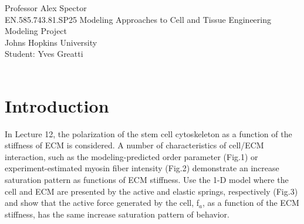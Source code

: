 \documentclass[12pt,twoside]{article}
\begin{document}
\noindent Professor Alex Spector\\
EN.585.743.81.SP25 Modeling Approaches to Cell and Tissue Engineering\\
Modeling Project\\
Johns Hopkins University\\
Student: Yves Greatti\\\

\section*{Introduction}
In Lecture 12, the polarization of the stem cell cytoskeleton as a function of
the stiffness of ECM is considered. A number of characteristics of cell/ECM
interaction, such as the modeling-predicted order parameter \cite{Zemel2010} (Fig.1) or
experiment-estimated myosin fiber intensity \cite{Zemel2010}  (Fig.2) demonstrate an increase 
saturation pattern as functions of ECM stiffness.
Use the 1-D model where the cell and ECM are presented by the active and
elastic springs, respectively \cite{Zemel2010}  (Fig.3) and show that the active force generated
by the cell, f$_a$, as a function of the ECM stiffness, has the same increase 
saturation pattern of behavior.



\end{document}
